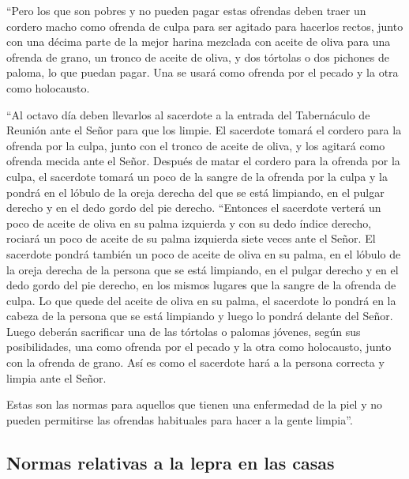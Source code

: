  ``Pero los que son pobres y no pueden pagar estas
ofrendas deben traer un cordero macho como ofrenda de culpa para ser
agitado para hacerlos rectos, junto con una décima parte de la mejor
harina mezclada con aceite de oliva para una ofrenda de grano, un tronco
de aceite de oliva,  y dos tórtolas o dos pichones de
paloma, lo que puedan pagar. Una se usará como ofrenda por el pecado y
la otra como holocausto.

 ``Al octavo día deben llevarlos al sacerdote a la
entrada del Tabernáculo de Reunión ante el Señor para que los limpie.
 El sacerdote tomará el cordero para la ofrenda por la
culpa, junto con el tronco de aceite de oliva, y los agitará como
ofrenda mecida ante el Señor.  Después de matar el
cordero para la ofrenda por la culpa, el sacerdote tomará un poco de la
sangre de la ofrenda por la culpa y la pondrá en el lóbulo de la oreja
derecha del que se está limpiando, en el pulgar derecho y en el dedo
gordo del pie derecho.  ``Entonces el sacerdote verterá
un poco de aceite de oliva en su palma izquierda  y con
su dedo índice derecho, rociará un poco de aceite de su palma izquierda
siete veces ante el Señor.  El sacerdote pondrá también
un poco de aceite de oliva en su palma, en el lóbulo de la oreja derecha
de la persona que se está limpiando, en el pulgar derecho y en el dedo
gordo del pie derecho, en los mismos lugares que la sangre de la ofrenda
de culpa.  Lo que quede del aceite de oliva en su palma,
el sacerdote lo pondrá en la cabeza de la persona que se está limpiando
y luego lo pondrá delante del Señor.  Luego deberán
sacrificar una de las tórtolas o palomas jóvenes, según sus
posibilidades,  una como ofrenda por el pecado y la otra
como holocausto, junto con la ofrenda de grano. Así es como el sacerdote
hará a la persona correcta y limpia ante el Señor.

 Estas son las normas para aquellos que tienen una
enfermedad de la piel y no pueden permitirse las ofrendas habituales
para hacer a la gente limpia''.

\hypertarget{normas-relativas-a-la-lepra-en-las-casas}{%
\subsection{Normas relativas a la lepra en las
casas}\label{normas-relativas-a-la-lepra-en-las-casas}}

